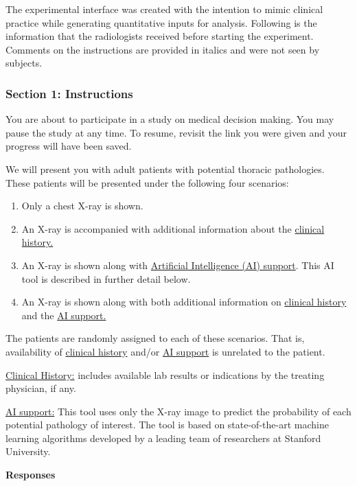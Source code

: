 The experimental interface was created with the intention to mimic
clinical practice while generating quantitative inputs for analysis.
Following is the information that the radiologists received before
starting the experiment. Comments on the instructions are provided
in italics and were not seen by subjects.

\subsubsection*{Section 1: Instructions}

You are about to participate in a study on medical decision making.
You may pause the study at any time. To resume, revisit the link you
were given and your progress will have been saved.

We will present you with adult patients with potential thoracic pathologies.
These patients will be presented under the following four scenarios:
\begin{enumerate}
\item Only a chest X-ray is shown.
\item An X-ray is accompanied with additional information about the \uline{clinical
history.}
\item An X-ray is shown along with \uline{Artificial Intelligence (AI)
support}. This AI tool is described in further detail below.
\item An X-ray is shown along with both additional information on \uline{clinical
history} and the \uline{AI support.}
\end{enumerate}
%
The patients are randomly assigned to each of these scenarios. That
is, availability of \uline{clinical history} and/or \uline{AI
support} is unrelated to the patient.

\uline{Clinical History:} includes available lab results or indications
by the treating physician, if any.

\uline{AI support:} This tool uses only the X-ray image to predict
the probability of each potential pathology of interest. The tool
is based on state-of-the-art machine learning algorithms developed
by a leading team of researchers at Stanford University.

\textbf{Responses}

